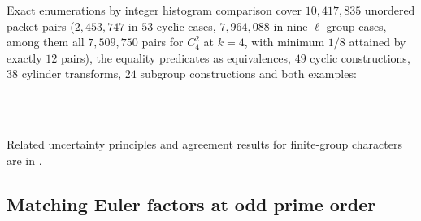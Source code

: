 Exact enumerations by integer histogram comparison cover $10{,}417{,}835$ unordered packet pairs
($2{,}453{,}747$ in $53$ cyclic cases, $7{,}964{,}088$ in nine $\ell$-group cases, among them all $7{,}509{,}750$ pairs for $C_4^2$ at
$k=4$, with minimum $1/8$ attained by exactly $12$ pairs), the equality predicates as equivalences, $49$ cyclic
constructions, $38$ cylinder transforms, $24$ subgroup constructions and both examples:
\begin{center}
\\
\\
\end{center}
Related uncertainty principles and agreement results for finite-group characters are in
\cite{Meshulam2006Uncertainty,MartinWalji2017Distinguishing}.

\subsection{Matching Euler factors at odd prime order}\label{rec:sec:omatch}

